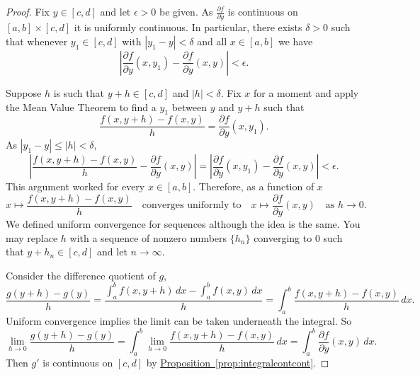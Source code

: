 \documentclass[12pt,openany]{book}
\newcommand{\abs}[1]{\left\lvert {#1} \right\rvert}
\theoremstyle{plain}
\theoremstyle{remark}
\theoremstyle{definition}
\theoremstyle{exercise}
\theoremstyle{example}
\newcommand{\propref}[1]{\hyperref[#1]{Proposition~\ref*{#1}}}
\begin{document}
\begin{proof}
Fix $y \in [c,d]$ and let $\epsilon > 0$ be given.
As $\frac{\partial f}{\partial y}$ is continuous on $[a,b] \times [c,d]$ it
is uniformly continuous.  In particular, there exists $\delta > 0$ such that
whenever $y_1 \in [c,d]$ with
$\abs{y_1-y} < \delta$ and all $x \in [a,b]$ we have
\begin{equation*}
\abs{\frac{\partial f}{\partial y}(x,y_1)-\frac{\partial f}{\partial y}(x,y)} < \epsilon .
\end{equation*}

Suppose $h$ is such that $y+h \in [c,d]$ and $\abs{h} < \delta$.
Fix $x$ for a moment
and apply the Mean Value Theorem to find a $y_1$ between $y$ and $y+h$ such that
\begin{equation*}
\frac{f(x,y+h)-f(x,y)}{h}
=
\frac{\partial f}{\partial y}(x,y_1) .
\end{equation*}
As $\abs{y_1-y} \leq \abs{h} < \delta$,
\begin{equation*}
\abs{
\frac{f(x,y+h)-f(x,y)}{h}
-
\frac{\partial f}{\partial y}(x,y) 
}
=
\abs{
\frac{\partial f}{\partial y}(x,y_1) 
-
\frac{\partial f}{\partial y}(x,y) 
}
< \epsilon .
\end{equation*}
This argument worked for every $x \in [a,b]$.  Therefore, as a function of
$x$
\begin{equation*}
x \mapsto \frac{f(x,y+h)-f(x,y)}{h}
\quad
\text{converges uniformly to}
\quad
x \mapsto \frac{\partial f}{\partial y}(x,y)
\quad
\text{as } h \to 0 .
\end{equation*}
We defined uniform convergence for sequences although the idea is the
same.  You may replace $h$ with a sequence of nonzero 
numbers $\{ h_n \}$
converging to $0$ such that $y+h_n \in [c,d]$ and let $n \to \infty$.

Consider the difference quotient of $g$,
\begin{equation*}
\frac{g(y+h)-g(y)}{h}
=
\frac{\int_a^b f(x,y+h) \,dx -
\int_a^b f(x,y) \,dx }{h}
=
\int_a^b \frac{f(x,y+h)-f(x,y)}{h} \,dx .
\end{equation*}
Uniform convergence implies the limit can be taken underneath the integral.
So
\begin{equation*}
\lim_{h\to 0}
\frac{g(y+h)-g(y)}{h}
= 
\int_a^b 
\lim_{h\to 0}
\frac{f(x,y+h)-f(x,y)}{h} \,dx 
=
\int_a^b 
\frac{\partial f}{\partial y}(x,y) \,dx .
\end{equation*}
Then $g'$ is continuous on $[c,d]$ by
\propref{prop:integralcontcont}.
\end{proof}
\end{document}
